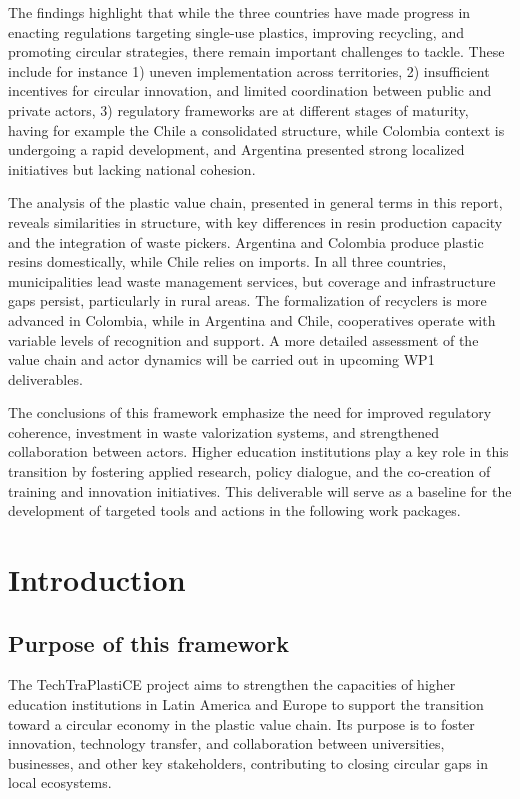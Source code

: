 \documentclass[
  12pt,
  oneside]{book}
\begin{document}
The findings highlight that while the three countries have made progress
in enacting regulations targeting single-use plastics, improving
recycling, and promoting circular strategies, there remain important
challenges to tackle. These include for instance 1) uneven
implementation across territories, 2) insufficient incentives for
circular innovation, and limited coordination between public and private
actors, 3) regulatory frameworks are at different stages of maturity,
having for example the Chile a consolidated structure, while Colombia
context is undergoing a rapid development, and Argentina presented
strong localized initiatives but lacking national cohesion.

The analysis of the plastic value chain, presented in general terms in
this report, reveals similarities in structure, with key differences in
resin production capacity and the integration of waste pickers.
Argentina and Colombia produce plastic resins domestically, while Chile
relies on imports. In all three countries, municipalities lead waste
management services, but coverage and infrastructure gaps persist,
particularly in rural areas. The formalization of recyclers is more
advanced in Colombia, while in Argentina and Chile, cooperatives operate
with variable levels of recognition and support. A more detailed
assessment of the value chain and actor dynamics will be carried out in
upcoming WP1 deliverables.

The conclusions of this framework emphasize the need for improved
regulatory coherence, investment in waste valorization systems, and
strengthened collaboration between actors. Higher education institutions
play a key role in this transition by fostering applied research, policy
dialogue, and the co-creation of training and innovation initiatives.
This deliverable will serve as a baseline for the development of
targeted tools and actions in the following work packages.

\chapter{Introduction}\label{introduction}

\section{Purpose of this framework}\label{purpose-of-this-framework}

The TechTraPlastiCE project aims to strengthen the capacities of higher
education institutions in Latin America and Europe to support the
transition toward a circular economy in the plastic value chain. Its
purpose is to foster innovation, technology transfer, and collaboration
between universities, businesses, and other key stakeholders,
contributing to closing circular gaps in local ecosystems.
\end{document}
